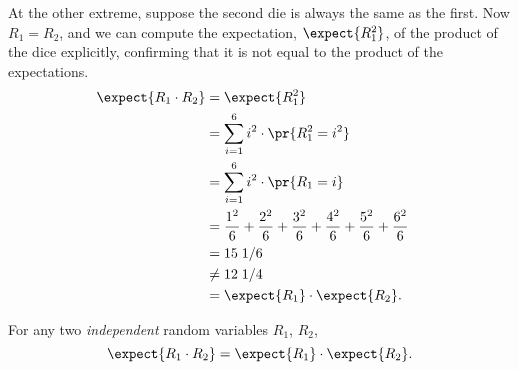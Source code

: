 At the other extreme, suppose the second die is always the same as the
first.  Now $R_1 = R_2$, and we can compute the expectation,
$\expect{R_1^2}$, of the product of the dice explicitly, confirming that
it is not equal to the product of the expectations.
\begin{align*}
\expect{R_1 \cdot R_2} & = \expect{R_1^2}\\
        & =    \sum_{i=1}^6 i^2 \cdot \pr{R_{1}^2 = i^2}
                    &  \\
        & =    \sum_{i=1}^6 i^2 \cdot \pr{R_{1} = i}\\
        & =    \frac{1^2}{6} + \frac{2^2}{6} + \frac{3^2}{6} + 
                \frac{4^2}{6} + \frac{5^2}{6} + \frac{6^2}{6} \\
        & =   15\; 1/6\\
        & \neq  12 \; 1/4\\
        & = \expect{R_1} \cdot \expect{R_2}.
\end{align*}
\iffalse & \text{from \eqref{R1R2}}\fi

\begin{theorem}\label{th:prod}
For any two \emph{independent} random variables $R_1$, $R_2$,
\[
\expect{R_1 \cdot R_2} = \expect{R_1} \cdot \expect{R_2}.
\]
\end{theorem}

